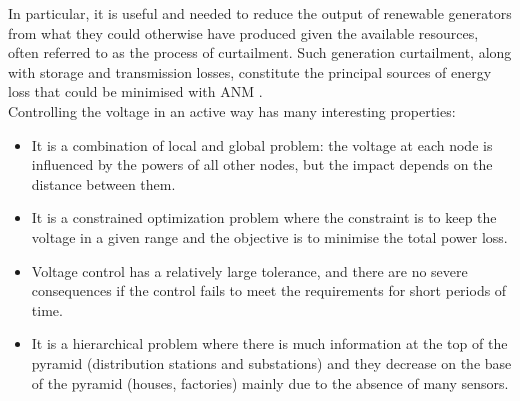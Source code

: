 In particular, it is useful and needed to reduce the output of renewable generators from what they could otherwise have produced given the available resources, often referred to as the process of curtailment. Such generation curtailment, along with storage and transmission losses, constitute the principal sources of energy loss that could be minimised with \gls{ANM} \cite{gym-anm}. \\

\noindent Controlling the voltage in an active way has many interesting properties:
\begin{itemize}
    \item It is a combination of local and global problem: the voltage at each node is influenced by the powers of all other nodes, but the impact depends on the distance between them.
    \item It is a constrained optimization problem where the constraint is to keep the voltage in a given range and the objective is to minimise the total power loss.
    \item Voltage control has a relatively large tolerance, and there are no severe consequences if the control fails to meet the requirements for short periods of time. \cite{wang2022multiagent}
    \item It is a hierarchical problem where there is much information at the top of the pyramid (distribution stations and substations) and they decrease on the base of the pyramid (houses, factories) mainly due to the absence of many sensors.
\end{itemize}


